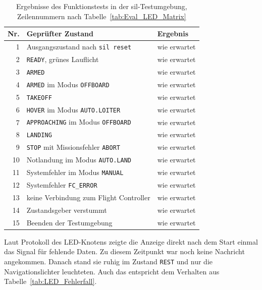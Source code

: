         \begin{table}[H]
            \centering
            \caption{Ergebnisse des Funktionstests in der \gls{sil}-Testumgebung, Zeilennummern nach Tabelle~\ref{tab:Eval_LED_Matrix}}
            \label{tab:Erg_LED_Matrix}
            \small
            \begin{tabularx}{\textwidth}{r X l}
                \toprule
                \textbf{Nr.} & \textbf{Geprüfter Zustand} & \textbf{Ergebnis} \\
                \midrule
                1  & Ausgangszustand nach \texttt{sil reset} & wie erwartet \\
                2  & \texttt{READY}, grünes Lauflicht & wie erwartet \\
                3  & \texttt{ARMED} & wie erwartet \\
                4  & \texttt{ARMED} im Modus \texttt{OFFBOARD} & wie erwartet \\
                5  & \texttt{TAKEOFF} & wie erwartet \\
                6  & \texttt{HOVER} im Modus \texttt{AUTO.LOITER} & wie erwartet \\
                7  & \texttt{APPROACHING} im Modus \texttt{OFFBOARD} & wie erwartet \\
                8  & \texttt{LANDING} & wie erwartet \\
                9  & \texttt{STOP} mit Missionsfehler \texttt{ABORT} & wie erwartet \\
                10 & Notlandung im Modus \texttt{AUTO.LAND} & wie erwartet \\
                11 & Systemfehler im Modus \texttt{MANUAL} & wie erwartet \\
                12 & Systemfehler \texttt{FC\_ERROR} & wie erwartet \\
                13 & keine Verbindung zum Flight Controller & wie erwartet \\
                14 & Zustandsgeber verstummt & wie erwartet \\
                15 & Beenden der Testumgebung & wie erwartet \\
                \bottomrule
            \end{tabularx}
        \end{table}
       

        Laut Protokoll des LED-Knotens zeigte die Anzeige direkt nach dem Start einmal das Signal für fehlende Daten. Zu diesem Zeitpunkt war noch keine Nachricht angekommen. Danach stand sie ruhig im Zustand \texttt{REST} und nur die Navigationslichter leuchteten. Auch das entspricht dem Verhalten aus Tabelle~\ref{tab:LED_Fehlerfall}.

